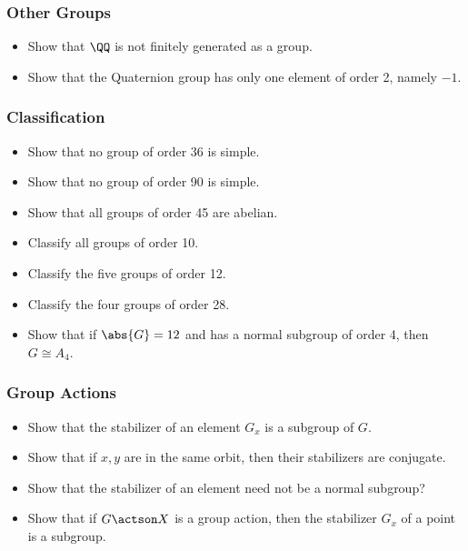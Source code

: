 \hypertarget{other-groups}{%
\subsubsection{Other Groups}\label{other-groups}}

\begin{itemize}
\tightlist
\item
  Show that \(\QQ\) is not finitely generated as a group.
\item
  Show that the Quaternion group has only one element of order 2, namely
  \(-1\).
\end{itemize}

\hypertarget{classification}{%
\subsubsection{Classification}\label{classification}}

\begin{itemize}
\tightlist
\item
  Show that no group of order 36 is simple.
\item
  Show that no group of order 90 is simple.
\item
  Show that all groups of order 45 are abelian.
\item
  Classify all groups of order 10.
\item
  Classify the five groups of order 12.
\item
  Classify the four groups of order 28.
\item
  Show that if \(\abs{G} = 12\) and has a normal subgroup of order 4,
  then \(G \cong A_4\).
\end{itemize}

\hypertarget{group-actions-1}{%
\subsubsection{Group Actions}\label{group-actions-1}}

\begin{itemize}
\tightlist
\item
  Show that the stabilizer of an element \(G_x\) is a subgroup of \(G\).
\item
  Show that if \(x, y\) are in the same orbit, then their stabilizers
  are conjugate.
\item
  Show that the stabilizer of an element need not be a normal subgroup?
\item
  Show that if \(G \actson X\) is a group action, then the stabilizer
  \(G_x\) of a point is a subgroup.
\end{itemize}

